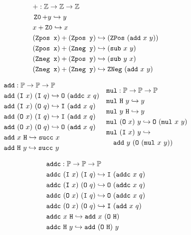 \begin{figure}
\begin{framed}
{\footnotesize
\centering
\begin{align*}
&+: \mathbb{Z} \rightarrow \mathbb{Z} \rightarrow \mathbb{Z} \\
& \mathop{\texttt{Z0}} + y \hookrightarrow y \\
& x + \mathop{\texttt{Z0}} \hookrightarrow x \\
& (\texttt{Zpos x}) + (\texttt{Zpos y}) \hookrightarrow (\mathop{\texttt{ZPos}}~(\texttt{add}~x~y))  \\
& (\texttt{Zpos x}) + (\texttt{Zneg y}) \hookrightarrow (\texttt{sub}~x~y)  \\
& (\texttt{Zneg x}) + (\texttt{Zpos y}) \hookrightarrow (\texttt{sub}~y~x)  \\
& (\texttt{Zneg x}) + (\texttt{Zneg y}) \hookrightarrow \mathop{\texttt{ZNeg}}~(\texttt{add}~x~y)
\end{align*}
\noindent

\[
\begin{array}[t]{ll}
\begin{aligned}
&\texttt{add} : \mathbb{P} \rightarrow \mathbb{P} \rightarrow \mathbb{P} \\
& \texttt{add}~(\texttt{I}~x)~(\texttt{I}~q) \hookrightarrow \texttt{O}~(\texttt{addc}~x~q) \\
& \texttt{add}~(\texttt{I}~x)~(\texttt{O}~q) \hookrightarrow \texttt{I}~(\texttt{add}~x~q) \\
& \texttt{add}~(\texttt{O}~x)~(\texttt{I}~q) \hookrightarrow \texttt{I}~(\texttt{add}~x~q) \\
& \texttt{add}~(\texttt{O}~x)~(\texttt{O}~q) \hookrightarrow \texttt{O}~(\texttt{add}~x~q) \\
& \texttt{add}~x~\texttt{H} \hookrightarrow \texttt{succ}~x \\
& \texttt{add}~\texttt{H}~y \hookrightarrow \texttt{succ}~y \\
\end{aligned}
&
\begin{aligned}
&\texttt{mul} : \mathbb{P} \rightarrow \mathbb{P} \rightarrow \mathbb{P} \\
& \texttt{mul}~\texttt{H}~y \hookrightarrow y \\
& \texttt{mul}~y~\texttt{H} \hookrightarrow y \\
& \texttt{mul}~(\texttt{O}~x)~y \hookrightarrow \texttt{O}~(\texttt{mul}~x~y) \\
& \texttt{mul}~(\texttt{I}~x)~y \hookrightarrow \\
& \quad \texttt{add}~y~(\texttt{O}~(\texttt{mul}~x~y)) \\
\end{aligned}
\end{array}
\]
\noindent

\begin{align*}
&\texttt{addc} : \mathbb{P} \rightarrow \mathbb{P} \rightarrow \mathbb{P} \\
& \texttt{addc}~(\texttt{I}~x)~(\texttt{I}~q) \hookrightarrow \texttt{I}~(\texttt{addc}~x~q) \\
& \texttt{addc}~(\texttt{I}~x)~(\texttt{O}~q) \hookrightarrow \texttt{O}~(\texttt{addc}~x~q) \\
& \texttt{addc}~(\texttt{O}~x)~(\texttt{I}~q) \hookrightarrow \texttt{O}~(\texttt{addc}~x~q) \\
& \texttt{addc}~(\texttt{O}~x)~(\texttt{O}~q) \hookrightarrow \texttt{I}~(\texttt{add}~x~q) \\
& \texttt{addc}~x~\texttt{H} \hookrightarrow \texttt{add}~x~(\texttt{O}~\texttt{H}) \\
& \texttt{addc}~\texttt{H}~y \hookrightarrow \texttt{add}~(\texttt{O}~\texttt{H})~y \\
\end{align*}
\noindent

}
\end{framed}
\end{figure}
